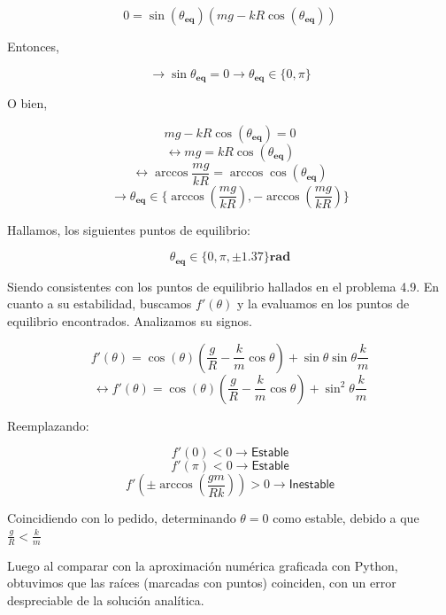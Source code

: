 \documentclass{article}
\begin{document}
   	$$
   	0 = \sin{(\theta_{\textbf{eq}})} (mg - kR \cos{(\theta_{\textbf{eq}})})
   	$$
   	 
   	Entonces,
   	 
   	 $$\rightarrow \sin{\theta_{\textbf{eq}}} = 0 \rightarrow \theta_{\textbf{eq}} \in \lbrace 0, \pi \rbrace $$
   	 
   	O bien,
   	 
   	$$
		mg - kR \cos{(\theta_{\textbf{eq}})} = 0 
	$$
	$$
		\leftrightarrow mg = kR \cos{(\theta_{\textbf{eq}})} 
   	$$
   	$$
		\leftrightarrow \arccos{\frac{mg}{kR}} = \arccos{\cos{(\theta_{\textbf{eq}})}} 
   	$$
   	$$
		\rightarrow \theta_{\textbf{eq}} \in \lbrace \arccos{(\frac{mg}{kR})}, -\arccos{(\frac{mg}{kR})} \rbrace 
   	$$

	Hallamos, los siguientes puntos de equilibrio:
	
	$$\theta_{\textbf{eq}} \in \lbrace 0, \pi, \pm1.37 \rbrace \textbf{rad}$$
	
	Siendo consistentes con los puntos de equilibrio hallados en el problema 4.9. En cuanto a su estabilidad, buscamos $f'(\theta)$ y la evaluamos en los puntos de equilibrio encontrados. Analizamos su signos.
	
	$$
		f'(\theta) = \cos{(\theta)} (\frac{g}{R} - \frac{k}{m} \cos{\theta}) + \sin{\theta} \sin{\theta} \frac{k}{m}  
	$$
	$$
		\leftrightarrow f'(\theta) = \cos{(\theta)} (\frac{g}{R} - \frac{k}{m} \cos{\theta}) + \sin^2 {\theta} \frac{k}{m}  
	$$
	
	Reemplazando:
	
	$$f'(0) < 0 \rightarrow \textsf{Estable}$$
	$$f'(\pi) < 0 \rightarrow \textsf{Estable}$$
	$$f'(\pm \arccos{(\frac{gm}{Rk})}) > 0 \rightarrow \textsf{Inestable}$$
	
	Coincidiendo con lo pedido, determinando $\theta = 0$ como estable, debido a que $\frac{g}{R} < \frac{k}{m}$

	Luego al comparar con la aproximaci\'on num\'erica graficada con Python, obtuvimos que las ra\'ices (marcadas con puntos) coinciden, con un error despreciable de la soluci\'on anal\'itica.
		
\end{document}
